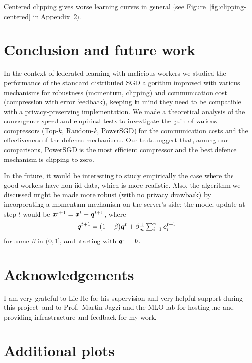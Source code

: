 \documentclass{article}
\begin{document}
Centered clipping gives worse learning curves in general (see Figure~\ref{fig:clipping-centered} in Appendix~\ref{app:additional-plots}).



\section{Conclusion and future work}


In the context of federated learning with malicious workers we studied the performance of the standard distributed SGD algorithm improved with various mechanisms for robustness (momentum, clipping) and communication cost (compression with error feedback), keeping in mind they need to be compatible with a privacy-preserving implementation. We made a theoretical analysis of the convergence speed and empirical tests to investigate the gain of various compressors (Top-$k$, Random-$k$, PowerSGD) for the communication costs and the effectiveness of the defence mechanisms. Our tests suggest that, among our comparisons, PowerSGD is the most efficient compressor and the best defence mechanism is clipping to zero.

In the future, it would be interesting to study empirically the case where the good workers have non-iid data, which is more realistic. Also, the algorithm we discussed might be made more robust (with no privacy drawback) by incorporating a momentum mechanism on the server's side: the model update at step $t$ would be $\bm{x}^{t+1} = \bm{x}^t - \bm{q}^{t+1}$, where 
\[
  \bm{q}^{t+1} = (1-\beta) \bm{q}^t + \beta \tfrac{1}{n} \textstyle\sum_{i=1}^n \bm{c}_i^{t+1}
\]
for some $\beta$ in $(0,1]$, and starting with $\bm{q}^1 = 0$.


\section*{Acknowledgements}

I am very grateful to Lie He for his supervision and very helpful support during this project, and to Prof.~Martin Jaggi and the MLO lab for hosting me and providing infrastructure and feedback for my work.


\printbibliography


\clearpage

\appendix


\section{Additional plots}\label{app:additional-plots}
\end{document}

